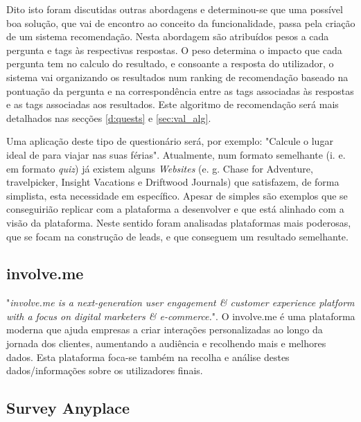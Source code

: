 Dito isto foram discutidas outras abordagens e determinou-se que uma possível boa solução, que vai de encontro ao conceito da funcionalidade, passa pela criação de um sistema recomendação.
Nesta abordagem são atribuídos pesos a cada pergunta e tags às respectivas respostas. O peso determina o impacto que cada pergunta tem no calculo do resultado, e consoante a resposta do utilizador, o sistema vai organizando os resultados num ranking de recomendação baseado na pontuação da pergunta e na correspondência entre as tags associadas às respostas e as tags associadas aos resultados. Este algoritmo de recomendação será mais detalhados nas secções \ref{d:quests} e \ref{sec:val_alg}.

Uma aplicação deste tipo de questionário será, por exemplo: "Calcule o lugar ideal de para viajar nas suas férias". Atualmente, num formato semelhante (i. e. em formato \textit{quiz}) já existem alguns \textit{Websites} (e. g. Chase for Adventure\cite{chaseforadventure}, travelpicker\cite{travelpicker}, Insight Vacations\cite{insightvacations} e Driftwood Journals\cite{driftwoodjournals}) que satisfazem, de forma simplista, esta necessidade em específico. Apesar de simples são exemplos que se conseguirião replicar com a plataforma a desenvolver e que está alinhado com a visão da plataforma. Neste sentido foram analisadas plataformas mais poderosas, que se focam na construção de leads, e que conseguem um resultado semelhante.


\subsection{involve.me}
\label{involvemeM}


"\textit{involve.me is a next-generation user engagement \& customer experience platform with a focus on digital marketers \& e-commerce.}"\cite{involve}. O involve.me é uma plataforma moderna que ajuda empresas a criar interações personalizadas ao longo da jornada dos clientes, aumentando a audiência e recolhendo mais e melhores dados. Esta plataforma foca-se também na recolha e análise destes dados/informações sobre os utilizadores finais.


\subsection{Survey Anyplace}
\label{surveyanyplaceM}


